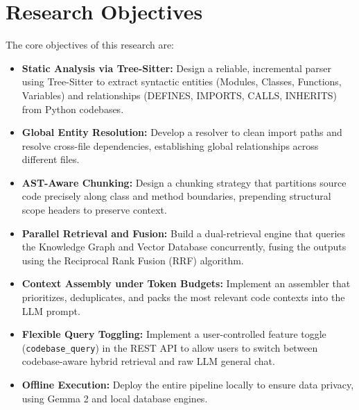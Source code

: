 \documentclass[12pt,a4paper,oneside]{report}
\begin{document}
\section{Research Objectives}
The core objectives of this research are:
\begin{itemize}
    \item \textbf{Static Analysis via Tree-Sitter:} Design a reliable, incremental parser using Tree-Sitter to extract syntactic entities (Modules, Classes, Functions, Variables) and relationships (DEFINES, IMPORTS, CALLS, INHERITS) from Python codebases.
    \item \textbf{Global Entity Resolution:} Develop a resolver to clean import paths and resolve cross-file dependencies, establishing global relationships across different files.
    \item \textbf{AST-Aware Chunking:} Design a chunking strategy that partitions source code precisely along class and method boundaries, prepending structural scope headers to preserve context.
    \item \textbf{Parallel Retrieval and Fusion:} Build a dual-retrieval engine that queries the Knowledge Graph and Vector Database concurrently, fusing the outputs using the Reciprocal Rank Fusion (RRF) algorithm.
    \item \textbf{Context Assembly under Token Budgets:} Implement an assembler that prioritizes, deduplicates, and packs the most relevant code contexts into the LLM prompt.
    \item \textbf{Flexible Query Toggling:} Implement a user-controlled feature toggle (\texttt{codebase\_query}) in the REST API to allow users to switch between codebase-aware hybrid retrieval and raw LLM general chat.
    \item \textbf{Offline Execution:} Deploy the entire pipeline locally to ensure data privacy, using Gemma 2 and local database engines.
\end{itemize}
\end{document}
